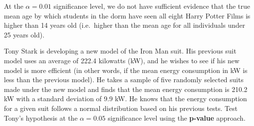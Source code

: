 \documentclass[noanswers]{exam}
\begin{document}
\begin{questions}
\begin{parts}
\begin{solution}[\stretch{1}]
At the $\alpha=0.01$ significance level, we do not have sufficient evidence that the true mean age by which students in the dorm have seen all eight Harry Potter Films is higher than 14 years old (i.e.\ higher than the mean age for all individuals under 25 years old). 

\vspace{3mm}

\end{solution} 

\end{parts}

\newpage

\question Tony Stark is developing a new model of the Iron Man suit. His previous suit model uses an average of 222.4 kilowatts (kW), and he wishes to see if his new model is more efficient (in other words, if the mean energy consumption in kW is less than the previous model). He takes a sample of five randomly selected suits made under the new model and finds that the mean energy consumption is 210.2 kW with a standard deviation of 9.9 kW. He knows that the energy consumption for a given suit follows a normal distribution based on his previous tests. Test Tony's hypothesis at the $\alpha=0.05$ significance level using the \textbf{p-value} approach.

\vspace{3mm}

\end{questions}
\end{document}
